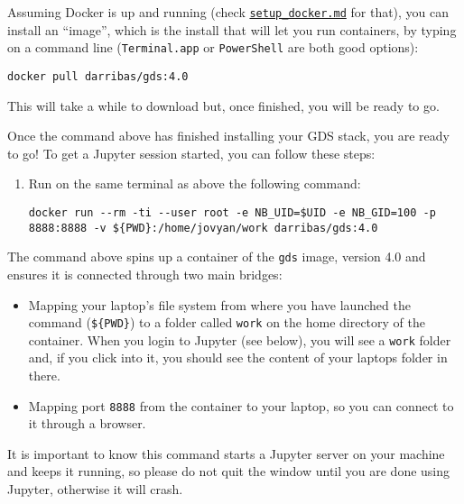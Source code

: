 \documentclass[
]{book}
\providecommand{\tightlist}{%
  \setlength{\itemsep}{0pt}\setlength{\parskip}{0pt}}
\begin{document}
Assuming Docker is up and running (check \href{setup_docker.md}{\texttt{setup\_docker.md}}
for that), you can install an ``image'', which is the install that will let you
run containers, by typing on a command line (\texttt{Terminal.app} or \texttt{PowerShell}
are both good options):

\begin{verbatim}
docker pull darribas/gds:4.0
\end{verbatim}

This will take a while to download but, once finished, you will be ready
to go.

Once the command above has finished installing your GDS stack, you are ready to go! To get a Jupyter session started, you can follow these steps:

\begin{enumerate}
\def\labelenumi{\arabic{enumi}.}
\item
  Run on the same terminal as above the following command:

\begin{verbatim}
docker run --rm -ti --user root -e NB_UID=$UID -e NB_GID=100 -p 8888:8888 -v ${PWD}:/home/jovyan/work darribas/gds:4.0
\end{verbatim}
\end{enumerate}

The command above spins up a container of the \texttt{gds} image, version 4.0 and
ensures it is connected through two main bridges:

\begin{itemize}
\tightlist
\item
  Mapping your laptop's file system from where you have launched the
  command (\texttt{\$\{PWD\}}) to a folder called \texttt{work} on the home directory of
  the container. When you login to Jupyter (see below), you will see a
  \texttt{work} folder and, if you click into it, you should see the content of
  your laptops folder in there.
\item
  Mapping port \texttt{8888} from the container to your laptop, so you can
  connect to it through a browser.
\end{itemize}

It is important to know this command starts a Jupyter server on your machine and keeps it running, so please do not quit the window until you are
done using Jupyter, otherwise it will crash.
\end{document}
